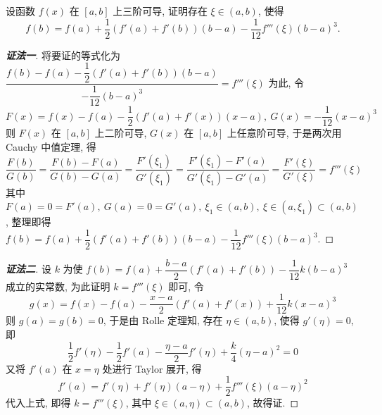 \begin{example}
    设函数 $f(x)$ 在 $[a,b]$ 上三阶可导, 证明存在 $\xi\in(a,b)$, 使得 $$f(b)=f(a)+\dfrac{1}{2}(f'(a)+f'(b))(b-a)-\dfrac{1}{12}f'''(\xi)(b-a)^3.$$
\end{example}
\begin{proof}[{\songti \textbf{证法一}}]
    将要证的等式化为 $ \dfrac {f(b)-f(a)-\dfrac {1}{2}(f'(a)+f'(b))(b-a)}{-\dfrac {1}{12}(b-a)^ {3}} =f''' ( \xi)$
    为此, 令
    $$F(x)=f(x)-f(a)-\dfrac {1}{2} (f'(a)+f'(x))(x-a),~G(x)=- \dfrac {1}{12} (x-a)^ {3} $$
    则 $F(x)$ 在 $[a,b]$ 上二阶可导, $G(x)$ 在 $[a,b]$ 上任意阶可导, 于是两次用 Cauchy 中值定理, 得
    $$\dfrac {F(b)}{G(b)}=\dfrac {F(b)-F(a)}{G(b)-G(a)}=\dfrac {F'(\xi _ {1})}{G'(\xi _ {1})}=\dfrac {F'(\xi _ {1})-F'(a)}{G'(\xi _ {1})-G'(a)}=\dfrac {F'(\xi )}{G'(\xi )}=f'''(\xi) $$
    其中 $F(a)=0=F'(a),~G(a)=0=G'(a),~\xi _{1}\in(a,b),~\xi\in(a,\xi_{1})\subset(a,b)$, 
    整理即得 $f(b)=f(a)+\dfrac{1}{2}(f'(a)+f'(b))(b-a)-\dfrac{1}{12}f'''(\xi)(b-a)^3.$
\end{proof}
\begin{proof}[{\songti \textbf{证法二}}]
    设 $k$ 为使 $f(b)=f(a)+\dfrac{b-a}{2}(f'(a)+f'(b))-\dfrac{1}{12}k(b-a)^{3}$ 成立的实常数, 为此证明 $k=f'''(\xi)$ 即可, 
    令 $$g(x)=f(x)-f(a)-\dfrac{x-a}{2}(f'(a)+f'(x))+\dfrac{1}{12}k(x-a)^{3}$$
    则 $g(a)=g(b)=0$, 于是由 Rolle 定理知, 存在 $\eta\in(a,b)$, 使得 $g'(\eta)=0$, 即
    $$\dfrac{1}{2}f'(\eta)-\dfrac{1}{2}f'(a)-\dfrac{\eta-a}{2}f'(\eta)+\dfrac{k}{4}(\eta-a)^{2}=0$$
    又将 $f'(a)$ 在 $x=\eta$ 处进行 Taylor 展开, 得
    $$f'(a)=f'(\eta)+f'(\eta)(a-\eta)+\dfrac{1}{2}f'''(\xi)(a-\eta)^{2}$$
    代入上式, 即得 $k=f'''(\xi)$, 其中 $\xi\in(a,\eta)\subset(a,b)$, 故得证.
\end{proof}
